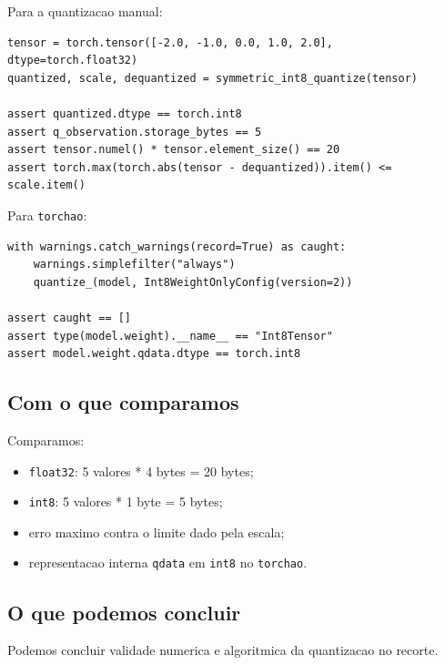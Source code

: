 Para a quantizacao manual:



\begin{Verbatim}[fontsize=\small,breaklines=true,label=python]
tensor = torch.tensor([-2.0, -1.0, 0.0, 1.0, 2.0], dtype=torch.float32)
quantized, scale, dequantized = symmetric_int8_quantize(tensor)

assert quantized.dtype == torch.int8
assert q_observation.storage_bytes == 5
assert tensor.numel() * tensor.element_size() == 20
assert torch.max(torch.abs(tensor - dequantized)).item() <= scale.item()
\end{Verbatim}



Para \texttt{torchao}:



\begin{Verbatim}[fontsize=\small,breaklines=true,label=python]
with warnings.catch_warnings(record=True) as caught:
    warnings.simplefilter("always")
    quantize_(model, Int8WeightOnlyConfig(version=2))

assert caught == []
assert type(model.weight).__name__ == "Int8Tensor"
assert model.weight.qdata.dtype == torch.int8
\end{Verbatim}



\subsection{Com o que comparamos}



Comparamos:


\begin{itemize}
\item \texttt{float32}: 5 valores * 4 bytes = 20 bytes;
\item \texttt{int8}: 5 valores * 1 byte = 5 bytes;
\item erro maximo contra o limite dado pela escala;
\item representacao interna \texttt{qdata} em \texttt{int8} no \texttt{torchao}.
\end{itemize}


\subsection{O que podemos concluir}



Podemos concluir validade numerica e algoritmica da quantizacao no recorte.



